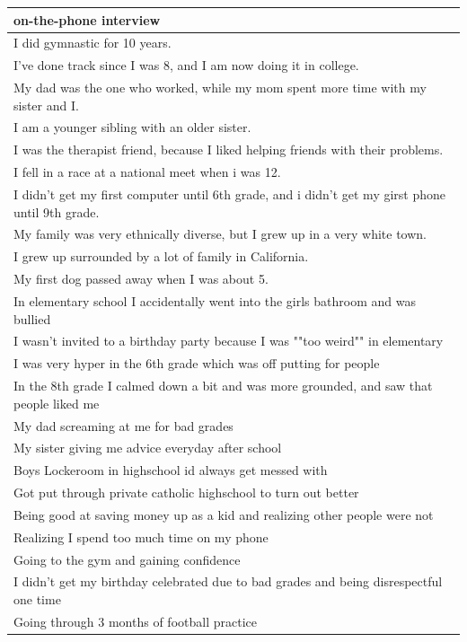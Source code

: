 \documentclass[
  .7em,
  letterpaper,
  DIV=11,
  numbers=noendperiod]{scrartcl}
\begin{document}
\begin{table}
\begin{tabular}{l}
\hline
on-the-phone interview\\
\hline
I did gymnastic for 10 years.\\
\hline
I've done track since I was 8, and I am now doing it in college.\\
\hline
My dad was the one who worked, while my mom spent more time with my sister and I.\\
\hline
I am a younger sibling with an older sister.\\
\hline
I was the therapist friend, because I liked helping friends with their problems.\\
\hline
I fell in a race at a national meet when i was 12.\\
\hline
I didn't get my first computer until 6th grade, and i didn't get my girst phone until 9th grade.\\
\hline
My family was very ethnically diverse, but I grew up in a very white town.\\
\hline
I grew up surrounded by a lot of family in California.\\
\hline
My first dog passed away when I was about 5.\\
\hline
In elementary school I accidentally went into the girls bathroom and was bullied\\
\hline
I wasn't invited to a birthday party because I was ""too weird"" in elementary\\
\hline
I was very hyper in the 6th grade which was off putting for people\\
\hline
In the 8th grade I calmed down a bit and was more grounded, and saw that people liked me\\
\hline
My dad screaming at me for bad grades\\
\hline
My sister giving me advice everyday after school\\
\hline
Boys Lockeroom in highschool id always get messed with\\
\hline
Got put through private catholic highschool to turn out better\\
\hline
Being good at saving money up as a kid and realizing other people were not\\
\hline
Realizing I spend too much time on my phone\\
\hline
Going to the gym and gaining confidence\\
\hline
I didn't get my birthday celebrated due to bad grades and being disrespectful one time\\
\hline
Going through 3 months of football practice\\

\end{tabular}
\end{table}
\end{document}
